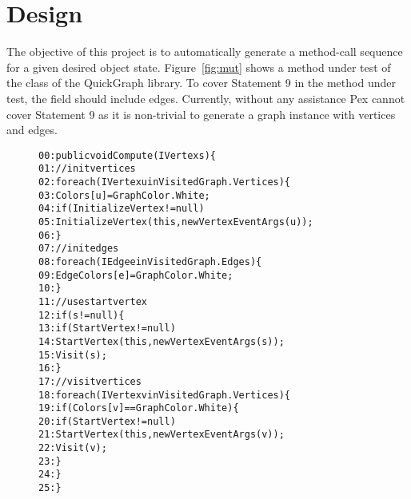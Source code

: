 \section{Design}
\label{design}

The objective of this project is to automatically generate a method-call sequence for a given desired object state. Figure~\ref{fig:mut} shows a method under test of the class  of the QuickGraph library. To cover Statement 9 in the method under test, the field  should include edges. Currently, without any assistance Pex cannot cover Statement 9 as it is non-trivial to generate a graph instance with vertices and edges.

\begin{figure}[t]
\begin{CodeOut}
\begin{alltt}
00:public void Compute(IVertex s) \{
01:\hspace*{0.2in}// init vertices
02:\hspace*{0.2in}foreach(IVertex u in VisitedGraph.Vertices) \{
03:\hspace*{0.3in}Colors[u]=GraphColor.White;
04:\hspace*{0.3in}if (InitializeVertex != null)
05:\hspace*{0.4in}InitializeVertex(this, new VertexEventArgs(u));
06:\hspace*{0.2in}\}
07:\hspace*{0.2in}//init edges
08:\hspace*{0.2in}foreach(IEdge e in VisitedGraph.Edges) \{
09:\hspace*{0.3in}EdgeColors[e]=GraphColor.White;
10:\hspace*{0.2in}\}
11:\hspace*{0.2in}// use start vertex
12:\hspace*{0.2in}if (s != null) \{
13:\hspace*{0.3in}if (StartVertex != null)
14:\hspace*{0.4in}StartVertex(this,new VertexEventArgs(s));
15:\hspace*{0.3in}Visit(s);
16:\hspace*{0.2in}\}
17:\hspace*{0.2in}// visit vertices
18:\hspace*{0.2in}foreach(IVertex v in VisitedGraph.Vertices) \{
19:\hspace*{0.3in}if (Colors[v] == GraphColor.White) \{
20:\hspace*{0.4in}if (StartVertex != null)
21:\hspace*{0.5in}StartVertex(this,new VertexEventArgs(v));
22:\hspace*{0.3in}Visit(v);
23:\hspace*{0.2in}\}
24:\hspace*{0.2in}\}
25:\}
\end{alltt}
\end{CodeOut}
\end{figure}

